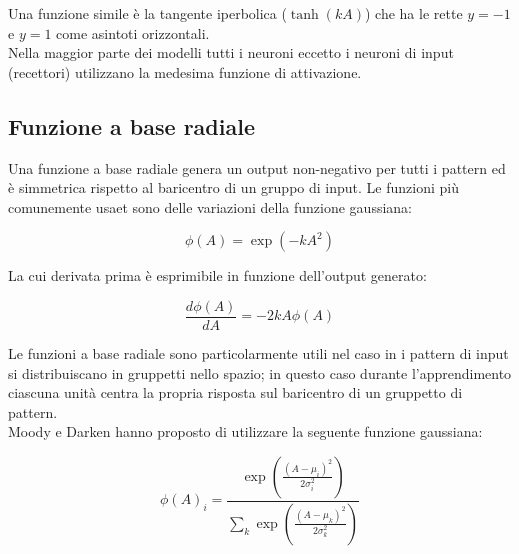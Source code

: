 Una funzione simile è la tangente iperbolica ($\tanh(kA)$) che ha le rette $y =
	-1$ e $y = 1$ come asintoti orizzontali.\\
Nella maggior parte dei modelli tutti i neuroni eccetto i neuroni di input
(recettori) utilizzano la medesima funzione di attivazione.

\subsection{Funzione a base radiale}

Una funzione a base radiale genera un output non-negativo per tutti i pattern ed
è simmetrica rispetto al baricentro di un gruppo di input. Le funzioni più
comunemente usaet sono delle variazioni della funzione gaussiana:

\begin{equation*}
	\phi(A) = \exp(-kA^2)
\end{equation*}

La cui derivata prima è esprimibile in funzione dell'output generato:

\begin{equation*}
	\frac{d\phi(A)}{dA} = -2kA\phi(A)
\end{equation*}

\begin{center}
\end{center}

Le funzioni a base radiale sono particolarmente utili nel caso in i pattern di
input si distribuiscano in gruppetti nello spazio; in questo caso durante
l'apprendimento ciascuna unità centra la propria risposta sul baricentro di un
gruppetto di pattern.\\

Moody e Darken hanno proposto di utilizzare la seguente funzione gaussiana:

\begin{equation*}
	\phi(A)_i = \frac{\exp(\frac{(A - \mu_i)^2}{2\sigma_i^2})}%
	{\sum_{k}\exp(\frac{(A - \mu_k)^2}{2\sigma_k^2})}
\end{equation*}


